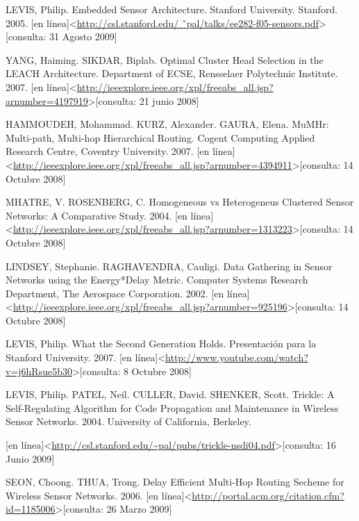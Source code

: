 \begin{thebibliography}{99}
\begin{sloppypar}
 LEVIS, Philip. Embedded Sensor Architecture. Stanford University. Stanford. 2005.
[en línea]\textless\url{http://csl.stanford.edu/ ˜pal/talks/ee282-f05-sensors.pdf}\textgreater[consulta: 31 Agosto 2009]

 YANG, Haiming. SIKDAR, Biplab. Optimal Cluster Head Selection in the LEACH Architecture. Department of ECSE, Rensselaer Polytechnic Institute. 2007.
[en línea]\textless \url{http://ieeexplore.ieee.org/xpl/freeabs_all.jsp?arnumber=4197919}\textgreater[consulta: 21 junio 2008] 

 HAMMOUDEH, Mohammad. KURZ, Alexander. GAURA, Elena. MuMHr: Multi-path, Multi-hop Hierarchical Routing. Cogent Computing Applied Research Centre, Coventry University. 2007.
[en línea]\textless \url{http://ieeexplore.ieee.org/xpl/freeabs_all.jsp?arnumber=4394911}\textgreater[consulta: 14 Octubre 2008] 

 MHATRE, V. ROSENBERG, C. Homogeneous vs Heterogeneus Clustered Sensor Networks: A Comparative Study. 2004.
[en línea]\textless \url{http://ieeexplore.ieee.org/xpl/freeabs_all.jsp?arnumber=1313223}\textgreater[consulta: 14 Octubre 2008]

 LINDSEY, Stephanie. RAGHAVENDRA, Cauligi. Data Gathering in Sensor Networks using the Energy*Delay Metric. Computer Systems Research Department, The Aerospace Corporation. 2002.
[en línea]\textless \url{http://ieeexplore.ieee.org/xpl/freeabs_all.jsp?arnumber=925196}\textgreater[consulta: 14 Octubre 2008] 

 LEVIS, Philip. What the Second Generation Holds. Presentación para la Stanford University. 2007.
[en línea]\textless \url{http://www.youtube.com/watch?v=j6hRsue5b30}\textgreater[consulta: 8 Octubre 2008] 

 LEVIS, Philip. PATEL, Neil. CULLER, David. SHENKER, Scott. Trickle: A Self-Regulating Algorithm for Code Propagation and Maintenance in Wireless Sensor Networks. 2004. University of California, Berkeley.

[en línea]\textless \url{http://csl.stanford.edu/~pal/pubs/trickle-nsdi04.pdf}\textgreater[consulta: 16 Junio 2009] 

 SEON, Choong. THUA, Trong. Delay Efficient Multi-Hop Routing Secheme for 
Wireless Sensor Networks. 2006.
[en línea]\textless \url{http://portal.acm.org/citation.cfm?id=1185006}\textgreater[consulta: 26 Marzo 2009] 


\end{sloppypar}
\end{thebibliography}
